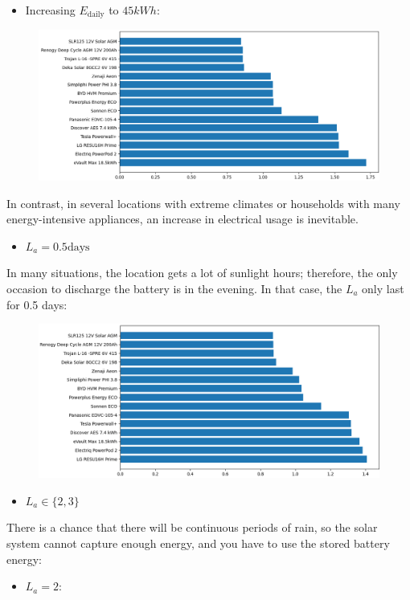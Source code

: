 \begin{itemize}
    \item Increasing $E_\text{daily}$ to $45kWh$:
\end{itemize}
\begin{figure}[h]
\centering
\includegraphics[scale=0.4]{src/3.png}
\end{figure}
In contrast, in several locations with extreme climates or households with many energy-intensive appliances, an increase in electrical usage is inevitable.
\begin{itemize}
    \item $L_a = 0.5 \text{days}$
\end{itemize}
In many situations, the location gets a lot of sunlight hours; therefore, the only occasion to discharge the battery is in the evening. In that case, the $L_a$ only last for 0.5 days:
\begin{figure}[H]
\centering
\includegraphics[scale=0.4]{src/4.png}
\end{figure}
\begin{itemize}
    \item $L_a \in \{2, 3\}$
\end{itemize}
There is a chance that there will be continuous periods of rain, so the solar system cannot capture enough energy, and you have to use the stored battery energy:
\begin{itemize}
    \item $L_a = 2:$
\end{itemize}
